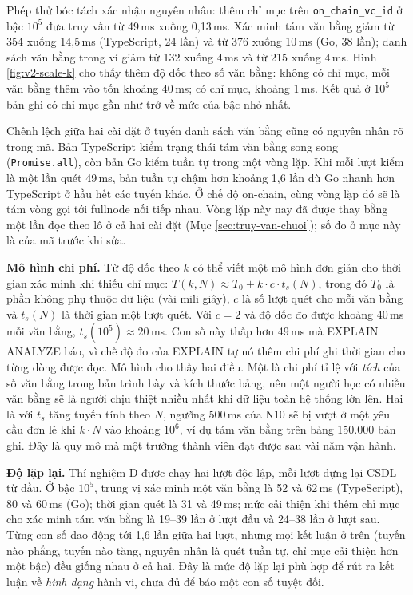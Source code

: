 

Phép thử bóc tách xác nhận nguyên nhân: thêm chỉ mục trên \texttt{on\_chain\_vc\_id} ở bậc $10^5$ đưa truy vấn từ 49\,ms xuống 0,13\,ms. Xác minh tám văn bằng giảm từ 354 xuống 14,5\,ms (TypeScript, 24 lần) và từ 376 xuống 10\,ms (Go, 38 lần); danh sách văn bằng trong ví giảm từ 132 xuống 4\,ms và từ 215 xuống 4\,ms. Hình \ref{fig:v2-scale-k} cho thấy thêm độ dốc theo số văn bằng: không có chỉ mục, mỗi văn bằng thêm vào tốn khoảng 40\,ms; có chỉ mục, khoảng 1\,ms. Kết quả ở $10^5$ bản ghi có chỉ mục gần như trở về mức của bậc nhỏ nhất.

Chênh lệch giữa hai cài đặt ở tuyến danh sách văn bằng cũng có nguyên nhân rõ trong mã. Bản TypeScript kiểm trạng thái tám văn bằng song song (\texttt{Promise.all}), còn bản Go kiểm tuần tự trong một vòng lặp. Khi mỗi lượt kiểm là một lần quét 49\,ms, bản tuần tự chậm hơn khoảng 1,6 lần dù Go nhanh hơn TypeScript ở hầu hết các tuyến khác. Ở chế độ on-chain, cùng vòng lặp đó sẽ là tám vòng gọi tới fullnode nối tiếp nhau. Vòng lặp này nay đã được thay bằng một lần đọc theo lô ở cả hai cài đặt (Mục \ref{sec:truy-van-chuoi}); số đo ở mục này là của mã trước khi sửa.

\textbf{Mô hình chi phí.} Từ độ dốc theo $k$ có thể viết một mô hình đơn giản cho thời gian xác minh khi thiếu chỉ mục: $T(k, N) \approx T_0 + k \cdot c \cdot t_s(N)$, trong đó $T_0$ là phần không phụ thuộc dữ liệu (vài mili giây), $c$ là số lượt quét cho mỗi văn bằng và $t_s(N)$ là thời gian một lượt quét. Với $c = 2$ và độ dốc đo được khoảng 40\,ms mỗi văn bằng, $t_s(10^5) \approx 20$\,ms. Con số này thấp hơn 49\,ms mà EXPLAIN ANALYZE báo, vì chế độ đo của EXPLAIN tự nó thêm chi phí ghi thời gian cho từng dòng được đọc. Mô hình cho thấy hai điều. Một là chi phí tỉ lệ với \emph{tích} của số văn bằng trong bản trình bày và kích thước bảng, nên một người học có nhiều văn bằng sẽ là người chịu thiệt nhiều nhất khi dữ liệu toàn hệ thống lớn lên. Hai là với $t_s$ tăng tuyến tính theo $N$, ngưỡng 500\,ms của N10 sẽ bị vượt ở một yêu cầu đơn lẻ khi $k \cdot N$ vào khoảng $10^6$, ví dụ tám văn bằng trên bảng 150.000 bản ghi. Đây là quy mô mà một trường thành viên đạt được sau vài năm vận hành.

\textbf{Độ lặp lại.} Thí nghiệm D được chạy hai lượt độc lập, mỗi lượt dựng lại CSDL từ đầu. Ở bậc $10^5$, trung vị xác minh một văn bằng là 52 và 62\,ms (TypeScript), 80 và 60\,ms (Go); thời gian quét là 31 và 49\,ms; mức cải thiện khi thêm chỉ mục cho xác minh tám văn bằng là 19--39 lần ở lượt đầu và 24--38 lần ở lượt sau. Từng con số dao động tới 1,6 lần giữa hai lượt, nhưng mọi kết luận ở trên (tuyến nào phẳng, tuyến nào tăng, nguyên nhân là quét tuần tự, chỉ mục cải thiện hơn một bậc) đều giống nhau ở cả hai. Đây là mức độ lặp lại phù hợp để rút ra kết luận về \emph{hình dạng} hành vi, chưa đủ để báo một con số tuyệt đối.

